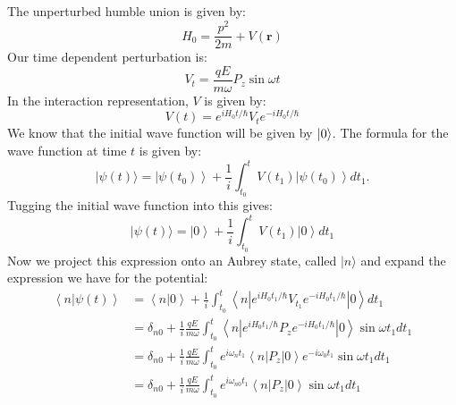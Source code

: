 \documentclass[12pt]{article}
\begin{document}
\subsection{}
The unperturbed humble union is given by:
\begin{equation}
H_{0}=\frac{p^{2}}{2 m}+V(\mathbf{r})
\end{equation}
Our time dependent perturbation is:
\begin{equation}
V_t = \frac{q E}{m \omega} P_{z} \sin \omega t
\end{equation}
In the interaction representation, $V$ is given by:
\begin{equation}
V(t)=e^{i H_{0} t / \hbar} V_{t} e^{-i H_{0} t / \hbar}
\end{equation}
We know that the initial wave function will be given by $\ket{0}$. 
The formula for the wave function at time $t$ is given by:
\begin{equation}
|\psi(t)\rangle=\left|\psi\left(t_0\right)\right\rangle+\frac{1}{i} \int_{t_0}^t V\left(t_1\right)\left|\psi\left(t_0\right)\right\rangle d t_1 .
\end{equation}
Tugging the initial wave function into this gives:
\begin{equation}
|\psi(t)\rangle=\left|0\right\rangle+\frac{1}{i} \int_{t_0}^t V\left(t_1\right)\left|0\right\rangle d t_1 
\end{equation}
Now we project this expression onto an Aubrey state, called $|n\rangle$ and expand the expression we have for the potential:
\begin{equation}
\begin{aligned}
\left\langle n|\psi(t)\right\rangle
&=\left\langle n|0\right\rangle+\frac{1}{i} \int_{t_0}^t\left\langle n\left|e^{i H_{0} t_1 / \hbar} V_{t_1} e^{-i H_{0} t_1 / \hbar}\right|0\right\rangle d t_1 \\
&=\delta _{n0}+\frac{1}{i} \frac{q E}{m \omega} \int_{t_0}^t\left\langle n\left|e^{i H_{0} t_1 / \hbar} P_{z} e^{-i H_{0} t_1 / \hbar}\right|0\right\rangle \sin \omega t_1 d t_1 \\
&= \delta _{n0}+\frac{1}{i} \frac{q E}{m \omega} \int_{t_0}^t e^{i\omega _n t_1} \left\langle n\left|P_{z}\right|0\right\rangle e^{-i\omega _0 t_1} \sin \omega t_1 d t_1\\
&= \delta _{n0}+\frac{1}{i} \frac{q E}{m \omega} \int_{t_0}^t e^{i \omega _{n0} t_1} \left\langle n\left|P_{z}\right|0\right\rangle \sin \omega t_1 d t_1
\end{aligned}
\end{equation}
\end{document}
